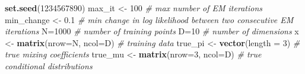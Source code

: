 \documentclass[]{article}
\newenvironment{Shaded}{\begin{snugshade}}{\end{snugshade}}
\newcommand{\CommentTok}[1]{\textcolor[rgb]{0.56,0.35,0.01}{\textit{#1}}}
\newcommand{\DataTypeTok}[1]{\textcolor[rgb]{0.13,0.29,0.53}{#1}}
\newcommand{\DecValTok}[1]{\textcolor[rgb]{0.00,0.00,0.81}{#1}}
\newcommand{\FloatTok}[1]{\textcolor[rgb]{0.00,0.00,0.81}{#1}}
\newcommand{\KeywordTok}[1]{\textcolor[rgb]{0.13,0.29,0.53}{\textbf{#1}}}
\newcommand{\NormalTok}[1]{#1}
\newcommand{\StringTok}[1]{\textcolor[rgb]{0.31,0.60,0.02}{#1}}
\begin{document}
\begin{Shaded}
\begin{Highlighting}[]
\KeywordTok{set.seed}\NormalTok{(}\DecValTok{1234567890}\NormalTok{)}
\NormalTok{max_it <-}\StringTok{ }\DecValTok{100} \CommentTok{# max number of EM iterations}
\NormalTok{min_change <-}\StringTok{ }\FloatTok{0.1} \CommentTok{# min change in log likelihood between two consecutive EM iterations}
\NormalTok{N=}\DecValTok{1000} \CommentTok{# number of training points}
\NormalTok{D=}\DecValTok{10} \CommentTok{# number of dimensions}
\NormalTok{x <-}\StringTok{ }\KeywordTok{matrix}\NormalTok{(}\DataTypeTok{nrow=}\NormalTok{N, }\DataTypeTok{ncol=}\NormalTok{D) }\CommentTok{# training data}
\NormalTok{true_pi <-}\StringTok{ }\KeywordTok{vector}\NormalTok{(}\DataTypeTok{length =} \DecValTok{3}\NormalTok{) }\CommentTok{# true mixing coefficients}
\NormalTok{true_mu <-}\StringTok{ }\KeywordTok{matrix}\NormalTok{(}\DataTypeTok{nrow=}\DecValTok{3}\NormalTok{, }\DataTypeTok{ncol=}\NormalTok{D) }\CommentTok{# true conditional distributions}


\end{Highlighting}
\end{Shaded}
\end{document}
